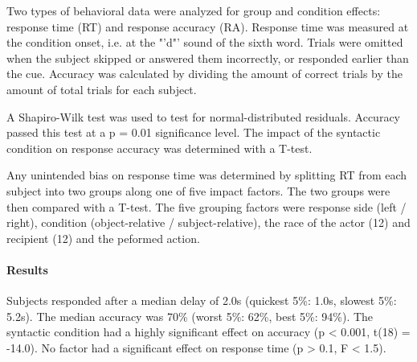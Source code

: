 Two types of behavioral data were analyzed for group and condition effects: response time (RT) and response accuracy (RA).
Response time was measured at the condition onset, i.e. at the "'d"' sound of the sixth word.
Trials were omitted when the subject skipped or answered them incorrectly, or responded earlier than the cue.
Accuracy was calculated by dividing the amount of correct trials by the amount of total trials for each subject.

A Shapiro-Wilk test was used to test for normal-distributed residuals.
Accuracy passed this test at a p = 0.01 significance level.
The impact of the syntactic condition on response accuracy was determined with a T-test.

Any unintended bias on response time was determined by splitting RT from each subject into two groups along one of five impact factors.
The two groups were then compared with a T-test.
The five grouping factors were response side (left / right), condition (object-relative / subject-relative), the race of the actor (12) and recipient (12) and the peformed action.

\paragraph{Results}

Subjects responded after a median delay of 2.0s (quickest 5\%: 1.0s, slowest 5\%: 5.2s).
The median accuracy was 70\% (worst 5\%: 62\%, best 5\%: 94\%).
The syntactic condition had a highly significant effect on accuracy (p < 0.001, t(18) = -14.0).
No factor had a significant effect on response time (p > 0.1, F < 1.5).

